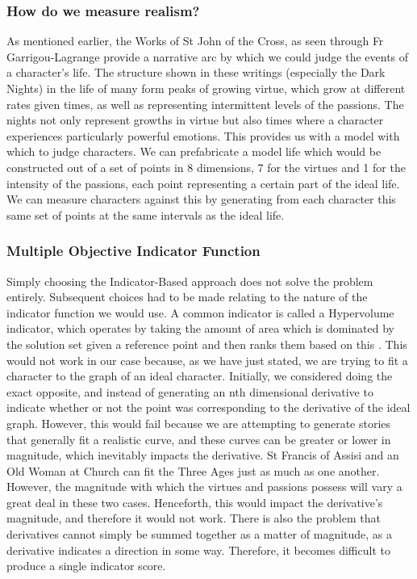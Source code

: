 \documentclass[11pt]{article}
\begin{document}
\subsubsection{How do we measure realism?}
As mentioned earlier, the Works of St John of the Cross, as seen through Fr Garrigou-Lagrange provide a narrative arc by which we could judge the events of a character's life. The structure shown in these writings (especially the Dark Nights) in the life of many form peaks of growing virtue, which grow at different rates given times, as well as representing intermittent levels of the passions. The nights not only represent growths in virtue but also times where a character experiences particularly powerful emotions. This provides us with a model with which to judge characters. We can prefabricate a model life which would be constructed out of a set of points in 8 dimensions, 7 for the virtues and 1 for the intensity of the passions, each point representing a certain part of the ideal life. We can measure characters against this by generating from each character this same set of points at the same intervals as the ideal life.\\

\subsubsection{Multiple Objective Indicator Function}
Simply choosing the Indicator-Based approach does not solve the problem entirely. Subsequent choices had to be made relating to the nature of the indicator function we would use. A common indicator is called a Hypervolume indicator, which operates by taking the amount of area which is dominated by the solution set given a reference point and then ranks them based on this \cite{AchievementScalarazingIndicatorBased}. This would not work in our case because, as we have just stated, we are trying to fit a character to the graph of an ideal character. Initially, we considered doing the exact opposite, and instead of generating an nth dimensional derivative to indicate whether or not the point was corresponding to the derivative of the ideal graph. However, this would fail because we are attempting to generate stories that generally fit a realistic curve, and these curves can be greater or lower in magnitude, which inevitably impacts the derivative. St Francis of Assisi and an Old Woman at Church can fit the Three Ages just as much as one another. However, the magnitude with which the virtues and passions possess will vary a great deal in these two cases. Henceforth, this would impact the derivative's magnitude, and therefore it would not work. There is also the problem that derivatives cannot simply be summed together as a matter of magnitude, as a derivative indicates a direction in some way. Therefore, it becomes difficult to produce a single indicator score.\\
\end{document}
